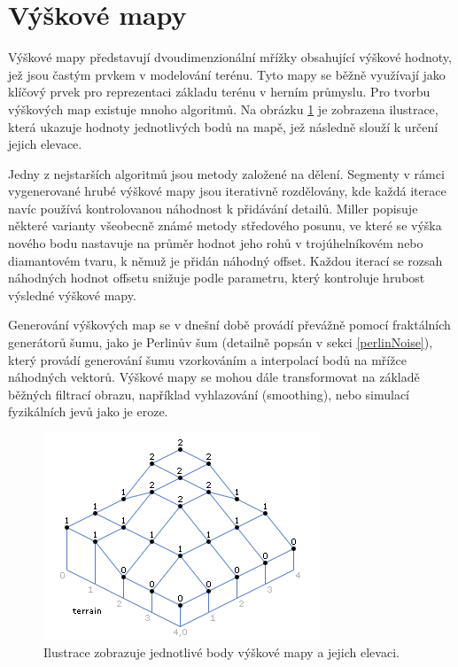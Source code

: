 \section{Výškové mapy}
\label{heightMaps}
Výškové mapy představují dvoudimenzionální mřížky obsahující výškové hodnoty, jež jsou častým prvkem v modelování terénu. Tyto mapy se běžně využívají jako klíčový prvek pro reprezentaci základu terénu v herním průmyslu. Pro tvorbu výškových map existuje mnoho algoritmů. Na obrázku \ref{HeightMap} je zobrazena ilustrace, která ukazuje hodnoty jednotlivých bodů na mapě, jež následně slouží k určení jejich elevace. \cite{heightMap08}

Jedny z nejstarších algoritmů jsou metody založené na dělení. Segmenty v rámci vygenerované hrubé výškové mapy jsou iterativně rozdělovány, kde každá iterace navíc používá kontrolovanou náhodnost k přidávání detailů. Miller \cite{MillerRendering} popisuje některé varianty všeobecně známé metody středového posunu, ve které se výška nového bodu nastavuje na průměr hodnot jeho rohů v trojúhelníkovém nebo diamantovém tvaru, k němuž je přidán náhodný offset. Každou iterací se rozsah náhodných hodnot offsetu snižuje podle parametru, který kontroluje hrubost výsledné výškové mapy. 

Generování výškových map se v dnešní době provádí převážně pomocí fraktálních generátorů šumu, jako je Perlinův šum (detailně popsán v sekci \ref{perlinNoise}), který provádí generování šumu vzorkováním a interpolací bodů na mřížce náhodných vektorů. Výškové mapy se mohou dále transformovat na základě běžných filtrací obrazu, například vyhlazování (smoothing), nebo simulací fyzikálních jevů jako je eroze. \cite{inproceedings}

\begin{figure}[H]
	\centering
	\includegraphics[scale=0.9]{obrazky-figures/HeightMap.png}
	\caption{Ilustrace zobrazuje jednotlivé body výškové mapy a jejich elevaci.}
	\label{HeightMap}
\end{figure}

